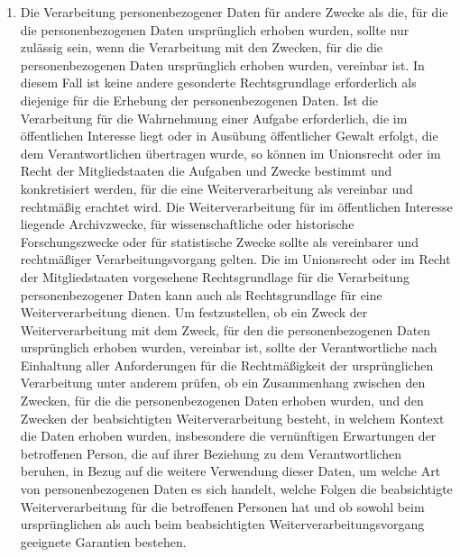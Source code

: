 \begin{enumerate}
   \item Die Verarbeitung personenbezogener Daten für andere Zwecke als die, für die die personenbezogenen Daten
    ursprünglich erhoben wurden, sollte nur zulässig sein, wenn die Verarbeitung mit den Zwecken, für die die
    personenbezogenen Daten ursprünglich erhoben wurden, vereinbar ist. In diesem Fall ist keine andere gesonderte
    Rechtsgrundlage erforderlich als diejenige für die Erhebung der personenbezogenen Daten. Ist die Verarbeitung für
    die Wahrnehmung einer Aufgabe erforderlich, die im öffentlichen Interesse liegt oder in Ausübung öffentlicher
    Gewalt erfolgt, die dem Verantwortlichen übertragen wurde, so können im Unionsrecht oder im Recht der
    Mitgliedstaaten die Aufgaben und Zwecke bestimmt und konkretisiert werden, für die eine Weiterverarbeitung als
    vereinbar und rechtmäßig erachtet wird. Die Weiterverarbeitung für im öffentlichen Interesse liegende Archivzwecke,
    für wissenschaftliche oder historische Forschungszwecke oder für statistische Zwecke sollte als vereinbarer und
    rechtmäßiger Verarbeitungsvorgang gelten. Die im Unionsrecht oder im Recht der Mitgliedstaaten vorgesehene
    Rechtsgrundlage für die Verarbeitung personenbezogener Daten kann auch als Rechtsgrundlage für eine
    Weiterverarbeitung dienen. Um festzustellen, ob ein Zweck der Weiterverarbeitung mit dem Zweck, für den die
    personenbezogenen Daten ursprünglich erhoben wurden, vereinbar ist, sollte der Verantwortliche nach Einhaltung
    aller Anforderungen für die Rechtmäßigkeit der ursprünglichen Verarbeitung unter anderem prüfen, ob ein
    Zusammenhang zwischen den Zwecken, für die die personenbezogenen Daten erhoben wurden, und den Zwecken der
    beabsichtigten Weiterverarbeitung besteht, in welchem Kontext die Daten erhoben wurden, insbesondere die
    vernünftigen Erwartungen der betroffenen Person, die auf ihrer Beziehung zu dem Verantwortlichen beruhen, in Bezug
    auf die weitere Verwendung dieser Daten, um welche Art von personenbezogenen Daten es sich handelt, welche Folgen
    die beabsichtigte Weiterverarbeitung für die betroffenen Personen hat und ob sowohl beim ursprünglichen als auch
    beim beabsichtigten Weiterverarbeitungsvorgang geeignete Garantien bestehen. 


\end{enumerate}
